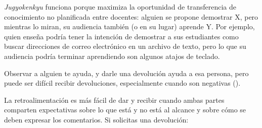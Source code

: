 \emph{Jugyokenkyu} funciona porque maximiza la oportunidad de transferencia de conocimiento no planificada entre docentes:
alguien se propone demostrar X,
pero mientras lo miran,
su audiencia también (o en su lugar) aprende Y.
Por ejemplo,
quien enseña podría tener la intención de demostrar a sus estudiantes como buscar direcciones de correo electrónico en un archivo de texto,
pero lo que su audiencia podría terminar aprendiendo son algunos atajos de teclado.


Observar a alguien te ayuda,
y darle una devolución ayuda a esa persona,
pero puede ser difícil recibir devoluciones,
especialmente cuando son negativas ().


La retroalimentación es más fácil de dar y recibir cuando ambas partes comparten expectativas
sobre lo que está y no está al alcance
y sobre cómo se deben expresar los comentarios.
Si solicitas una devolución:

